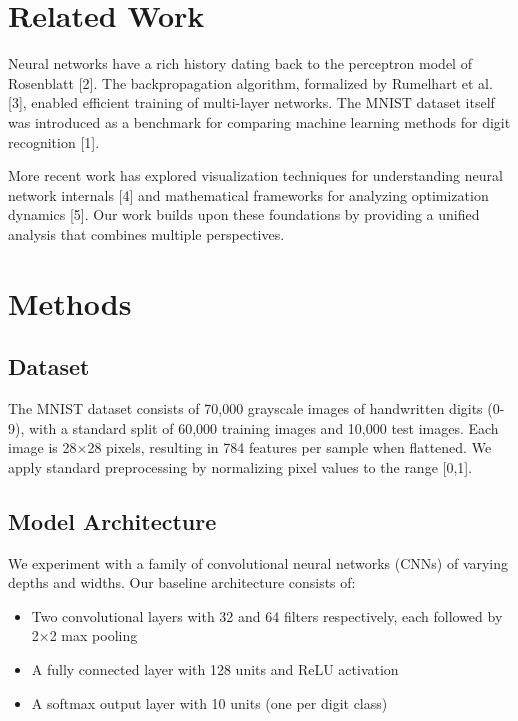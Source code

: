 \documentclass[
  11pt,
  twocolumn,
  a4paper]{article}
\providecommand{\tightlist}{%
  \setlength{\itemsep}{0pt}\setlength{\parskip}{0pt}}\usepackage{longtable,booktabs,array}
\begin{document}
\section{Related Work}\label{related-work}

Neural networks have a rich history dating back to the perceptron model
of Rosenblatt {[}2{]}. The backpropagation algorithm, formalized by
Rumelhart et al. {[}3{]}, enabled efficient training of multi-layer
networks. The MNIST dataset itself was introduced as a benchmark for
comparing machine learning methods for digit recognition {[}1{]}.

More recent work has explored visualization techniques for understanding
neural network internals {[}4{]} and mathematical frameworks for
analyzing optimization dynamics {[}5{]}. Our work builds upon these
foundations by providing a unified analysis that combines multiple
perspectives.

\section{Methods}\label{methods}

\subsection{Dataset}\label{dataset}

The MNIST dataset consists of 70,000 grayscale images of handwritten
digits (0-9), with a standard split of 60,000 training images and 10,000
test images. Each image is 28×28 pixels, resulting in 784 features per
sample when flattened. We apply standard preprocessing by normalizing
pixel values to the range {[}0,1{]}.

\subsection{Model Architecture}\label{model-architecture}

We experiment with a family of convolutional neural networks (CNNs) of
varying depths and widths. Our baseline architecture consists of:

\begin{itemize}
\tightlist
\item
  Two convolutional layers with 32 and 64 filters respectively, each
  followed by 2×2 max pooling
\item
  A fully connected layer with 128 units and ReLU activation
\item
  A softmax output layer with 10 units (one per digit class)
\end{itemize}
\end{document}

